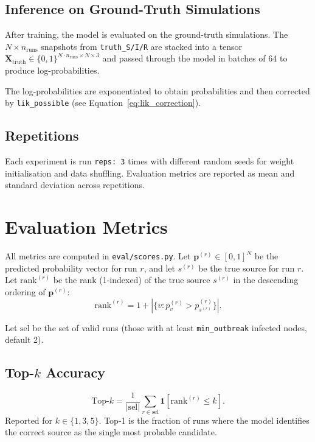 \documentclass[12pt,a4paper]{report}
\begin{document}
\section{Inference on Ground-Truth Simulations}

After training, the model is evaluated on the ground-truth simulations. The
$N \times n_{\text{runs}}$ snapshots from \texttt{truth\_S/I/R} are stacked into
a tensor $\mathbf{X}_{\text{truth}} \in \{0,1\}^{N \cdot n_{\text{runs}} \times N \times 3}$
and passed through the model in batches of 64 to produce log-probabilities.

The log-probabilities are exponentiated to obtain probabilities and then
corrected by \texttt{lik\_possible} (see Equation~\ref{eq:lik_correction}).

\section{Repetitions}

Each experiment is run \texttt{reps: 3} times with different random seeds for
weight initialisation and data shuffling. Evaluation metrics are reported as
mean and standard deviation across repetitions.

\chapter{Evaluation Metrics}
\label{chap:metrics}

All metrics are computed in \texttt{eval/scores.py}. Let $\mathbf{p}^{(r)} \in
[0,1]^N$ be the predicted probability vector for run $r$, and let $s^{(r)}$ be
the true source for run $r$. Let $\text{rank}^{(r)}$ be the rank (1-indexed) of
the true source $s^{(r)}$ in the descending ordering of $\mathbf{p}^{(r)}$:
\begin{equation}
  \text{rank}^{(r)} = 1 + |\{v : p_v^{(r)} > p_{s^{(r)}}^{(r)}\}|.
\end{equation}

Let $\text{sel}$ be the set of valid runs (those with at least
\texttt{min\_outbreak} infected nodes, default 2).

\section{Top-$k$ Accuracy}

\begin{equation}
  \text{Top-}k = \frac{1}{|\text{sel}|} \sum_{r \in \text{sel}} \mathbf{1}[\text{rank}^{(r)} \leq k].
\end{equation}
Reported for $k \in \{1, 3, 5\}$. Top-1 is the fraction of runs where the model
identifies the correct source as the single most probable candidate.
\end{document}
